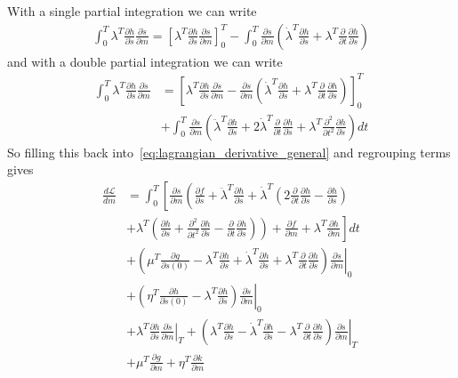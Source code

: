 \documentclass[10pt]{SelfArx} %
\newcommand{\pder}[2][]{\frac{\partial#1}{\partial#2}}
\newcommand{\ppder}[2][]{\frac{\partial^2#1}{\partial#2^2}}
\theoremstyle{definition}
\begin{document}
With a single partial integration we can write
\begin{equation}\label{eq:lagrangian_partial_first_order}
\begin{aligned}
\int^T_0  \lambda^T \pder[h]{\dot s} \pder[\dot s]{m} = \left[\lambda^T \pder[h]{\dot s} \pder[s]{m}\right]^T_0
 - \int_0^T \pder[s]{m}\left(\dot \lambda^T \pder[h]{\dot s} + \lambda^T \pder{t}\pder[h]{\dot s} \right)
\end{aligned}
\end{equation}
and with a double partial integration we can write
\begin{equation}\label{eq:lagrangian_partial_second_order}
\begin{aligned}
\int^T_0  \lambda^T \pder[h]{\ddot s} \pder[\ddot s]{m} &= \left[\lambda^T \pder[h]{\dot s} \pder[\dot s]{m} - \pder[s]{m}\left(\dot \lambda^T \pder[h]{\ddot s} + \lambda^T \pder{t}\pder[h]{\ddot s}\right)  \right]^T_0 \\
 &+ \int_0^T \pder[s]{m}\left(\ddot \lambda^T \pder[h]{\ddot s} + 2 \dot \lambda^T \pder{t}\pder[h]{\ddot s} + \lambda^T \ppder{t}\pder[h]{\ddot s} \right) dt 
\end{aligned}
\end{equation}
So filling this back into~\cref{eq:lagrangian_derivative_general} and regrouping terms gives
\begin{equation}
\begin{aligned}
\frac{d\mathcal{L}}{dm}& = \int_0^T \left[\pder[s]{m}\left( \pder[f]{s} + \ddot \lambda^T \pder[h]{\ddot s}
 + \dot \lambda^T\left(2\pder{t}\pder[h]{\ddot s}- \pder[h]{\dot s}\right)\right.\right. \\
& \left. \left.  + \lambda^T\left(\pder[h]{s} + \ppder{t}\pder[h]{\ddot s} -\pder{t}\pder[h]{\dot s}\right)\right)
 + \pder[f]{m} + \lambda^T \pder[h]{m}\right]dt \\
 &+\left.\left(\mu^T \pder[g]{s(0)} - \lambda^T\pder[h]{\dot s} + \dot \lambda^T \pder[h]{\ddot s} + \lambda^T\pder{t}\pder[h]{\ddot s}\right)\pder[s]{m}\right|_0 \\
 &+ \left. \left(\eta^T\pder[h]{\dot s(0)} - \lambda^T \pder[h]{\ddot s}\right)\pder[\dot s]{m}\right|_0 \\
 & + \left.\lambda^T \pder[h]{\ddot s} \pder[\dot s]{m}\right|_T + \left.\left(\lambda^T \pder[h]{\dot s} - \dot \lambda^T \pder[h]{\ddot s} - \lambda^T \pder{t}\pder[h]{\ddot s} \right)\pder[s]{m}\right|_T\\
 & + \mu^T \pder[g]{m} + \eta^T \pder[k]{m}
\end{aligned}
\end{equation}
\end{document}
